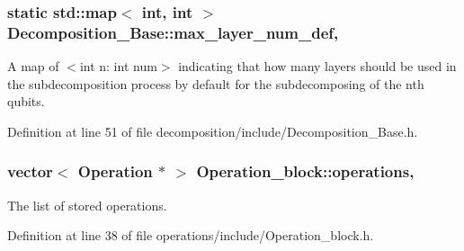 \subsubsection[{\texorpdfstring{max\+\_\+layer\+\_\+num\+\_\+def}{max_layer_num_def}}]{\setlength{\rightskip}{0pt plus 5cm}static std\+::map$<$ int, int $>$ Decomposition\+\_\+\+Base\+::max\+\_\+layer\+\_\+num\+\_\+def\hspace{0.3cm}{\ttfamily [static]}, {\ttfamily [inherited]}}\hypertarget{class_decomposition___base_a17952d9e72bbc214eb3a1466270b853d}{}\label{class_decomposition___base_a17952d9e72bbc214eb3a1466270b853d}


A map of $<$int n\+: int num$>$ indicating that how many layers should be used in the subdecomposition process by default for the subdecomposing of the nth qubits. 



Definition at line 51 of file decomposition/include/\+Decomposition\+\_\+\+Base.\+h.

\subsubsection[{\texorpdfstring{operations}{operations}}]{\setlength{\rightskip}{0pt plus 5cm}vector$<$ {\bf Operation} $\ast$ $>$ Operation\+\_\+block\+::operations\hspace{0.3cm}{\ttfamily [protected]}, {\ttfamily [inherited]}}\hypertarget{class_operation__block_a1efec4139888e591b59acd7b84497af1}{}\label{class_operation__block_a1efec4139888e591b59acd7b84497af1}


The list of stored operations. 



Definition at line 38 of file operations/include/\+Operation\+\_\+block.\+h.

